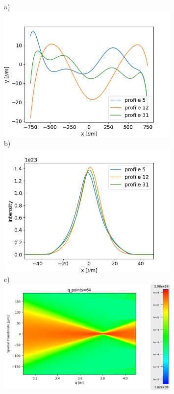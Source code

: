 \documentclass[]{article}
\begin{document}
  

\thispagestyle{empty}



\begin{figure}
    a)~~~~~~~~~~~~~~~~~~~~~~~~~~~~~~~~~~~~~~~~\\ \includegraphics[width=0.8\textwidth]{figures/Figure2a.png}
    b)~~~~~~~~~~~~~~~~~~~~~~~~~~~~~~~~~~~~~~~~\\ \includegraphics[width=0.8\textwidth]{figures/Figure2b.png}
    c)~~~~~~~~~~~~~~~~~~~~~~~~~~~~~~~~~~~~~~~~\\\includegraphics[width=0.8\textwidth]{figures/Figure2c.png}
\end{figure}

\end{document}
